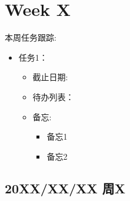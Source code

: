 % 
% 
%
%

\chapter{Week X}

  \par 本周任务跟踪:
  \begin{itemize}
    \item 任务1：
      \begin{itemize}
        \item 截止日期:
        \item 待办列表：
        \item 备忘:
          \begin{itemize}
            \item 备忘1
            \item 备忘2
          \end{itemize}
      \end{itemize}
  \end{itemize}

  \section{20XX/XX/XX 周X}
